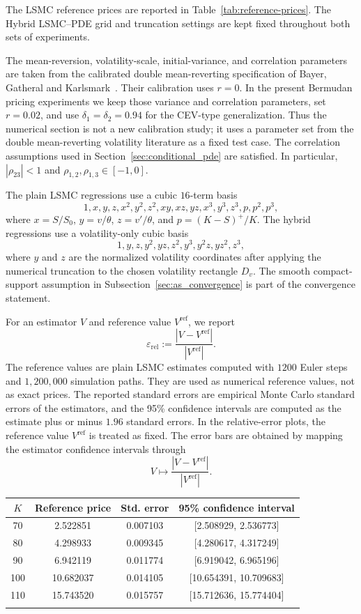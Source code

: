 \documentclass[pdflatex,sn-mathphys-num]{sn-jnl}
\makeatletter
\theoremstyle{thmstyleone}%
\theoremstyle{thmstylethree}%
\theoremstyle{thmstyletwo}%
\renewenvironment{table}[1][]{%
  \par\addvspace{12pt}%
  \noindent\begin{minipage}{\textwidth}%
  \def\@captype{table}%
  \centering%
  \tablebodyfont%
}{%
  \end{minipage}%
  \par\addvspace{12pt}%
}
\makeatother
\begin{document}
The LSMC reference prices are reported in Table~\ref{tab:reference-prices}. The
Hybrid LSMC--PDE grid and truncation settings are kept fixed throughout both
sets of experiments.

The mean-reversion, volatility-scale, initial-variance, and correlation
parameters are taken from the calibrated double mean-reverting specification of
Bayer, Gatheral and Karlsmark~\citep{bayer2013fast}. Their calibration uses
$r=0$. In the present Bermudan pricing experiments we keep those variance and
correlation parameters, set $r=0.02$, and use
$\delta_1=\delta_2=0.94$ for the CEV-type generalization. Thus the numerical
section is not a new calibration study; it uses a parameter set from the double
mean-reverting volatility literature as a fixed test case.
The correlation assumptions used in Section~\ref{sec:conditional_pde} are
satisfied. In particular, $|\rho_{23}|<1$ and $\rho_{1,2}, \rho_{1,3} \in [-1,0]$.

The plain LSMC regressions use a cubic $16$-term basis
$$
1,x,y,z,x^2,y^2,z^2,xy,xz,yz,x^3,y^3,z^3,p,p^2,p^3,
$$
where $x=S/S_0$, $y=v/\theta$, $z=v'/\theta$, and
$p=(K-S)^+/K$. The hybrid regressions use a volatility-only cubic basis
$$
1,y,z,y^2,yz,z^2,y^3,y^2z,yz^2,z^3,
$$
where $y$ and $z$ are the normalized volatility coordinates after applying
the numerical truncation to the chosen volatility rectangle $D_v$. The smooth
compact-support assumption in Subsection~\ref{sec:as_convergence} is part of
the convergence statement.

For an estimator $V$ and reference value $V^{\mathrm{ref}}$, we report
$$
\varepsilon_{\mathrm{rel}}
:=
\frac{|V-V^{\mathrm{ref}}|}{|V^{\mathrm{ref}}|}.
$$
The reference values are plain LSMC estimates computed with $1200$
Euler steps and $1{,}200{,}000$ simulation paths. They are used as numerical
reference values, not as exact prices. The reported standard errors are
empirical Monte Carlo standard errors of the estimators, and the
95\% confidence intervals are computed as the estimate plus or minus
$1.96$ standard errors. In the relative-error
plots, the reference value
$V^{\mathrm{ref}}$ is treated as fixed. The error bars are obtained by mapping
the estimator confidence intervals through
$$
V\mapsto \frac{|V-V^{\mathrm{ref}}|}{|V^{\mathrm{ref}}|}.
$$
\begin{table}[htbp]
\centering
\caption{LSMC reference values for the parameter set in Table~\ref{tab:parameter-setup}.}
\label{tab:reference-prices}
\small
\begin{tabularx}{0.82\textwidth}{@{}cccc@{}}
\toprule
$K$ & Reference price & Std. error & 95\% confidence interval \\
\midrule
70 & 2.522851 & 0.007103 & [2.508929, 2.536773] \\
80 & 4.298933 & 0.009345 & [4.280617, 4.317249] \\
90 & 6.942119 & 0.011774 & [6.919042, 6.965196] \\
100 & 10.682037 & 0.014105 & [10.654391, 10.709683] \\
110 & 15.743520 & 0.015757 & [15.712636, 15.774404] \\
\botrule
\end{tabularx}
\end{table}
\end{document}
